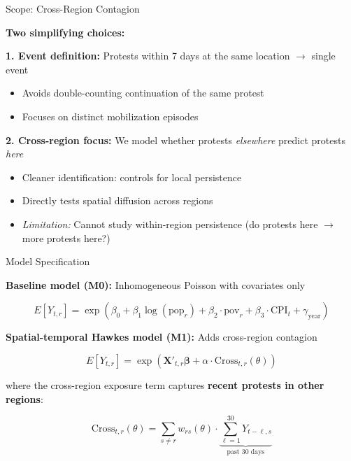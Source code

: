 \documentclass[aspectratio=169]{beamer}
\begin{document}
\begin{frame}{Scope: Cross-Region Contagion}

\textbf{Two simplifying choices:}

\vspace{1em}

\textbf{1. Event definition:} Protests within 7 days at the same location $\to$ single event
\begin{itemize}
    \item Avoids double-counting continuation of the same protest
    \item Focuses on distinct mobilization episodes
\end{itemize}

\vspace{1em}

\textbf{2. Cross-region focus:} We model whether protests \textit{elsewhere} predict protests \textit{here}
\begin{itemize}
    \item Cleaner identification: controls for local persistence
    \item Directly tests spatial diffusion across regions
    \item \textit{Limitation:} Cannot study within-region persistence (do protests here $\to$ more protests here?)
\end{itemize}

\end{frame}

\begin{frame}{Model Specification}

\textbf{Baseline model (M0):} Inhomogeneous Poisson with covariates only

\begin{equation*}
E[Y_{t,r}] = \exp\left(\beta_0 + \beta_1 \log(\text{pop}_r) + \beta_2 \cdot \text{pov}_r + \beta_3 \cdot \text{CPI}_t + \gamma_{\text{year}}\right)
\end{equation*}

\vspace{1em}

\textbf{Spatial-temporal Hawkes model (M1):} Adds cross-region contagion

\begin{equation*}
E[Y_{t,r}] = \exp\left(\mathbf{X}'_{t,r}\boldsymbol{\beta} + \alpha \cdot \text{Cross}_{t,r}(\theta)\right)
\end{equation*}

where the cross-region exposure term captures \textbf{recent protests in other regions}:

\begin{equation*}
\text{Cross}_{t,r}(\theta) = \sum_{s \neq r} w_{rs}(\theta) \cdot \underbrace{\sum_{\ell=1}^{30} Y_{t-\ell,s}}_{\text{past 30 days}}
\end{equation*}

\end{frame}
\end{document}
